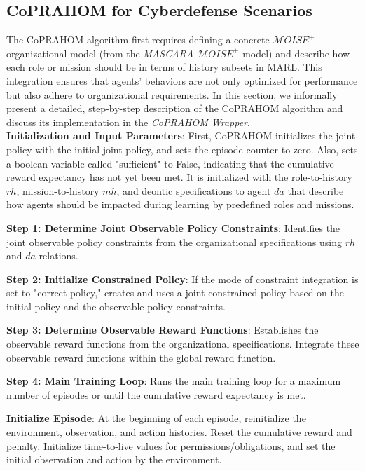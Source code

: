 \documentclass[conference]{IEEEtran}
\newcounter{relation}
\begin{document}
\subsection{CoPRAHOM for Cyberdefense Scenarios}

The CoPRAHOM algorithm first requires defining a concrete $\mathcal{M}OISE^+$ organizational model (from the \textit{MASCARA-$\mathcal{M}OISE^+$} model) and describe how each role or mission should be in terms of history subsets in MARL.
This integration ensures that agents' behaviors are not only optimized for performance but also adhere to organizational requirements.
%
In this section, we informally present a detailed, step-by-step description of the CoPRAHOM algorithm and discuss its implementation in the \textit{CoPRAHOM Wrapper}.\\

\textbf{Initialization and Input Parameters}:
First, CoPRAHOM initializes the joint policy with the initial joint policy, and sets the episode counter to zero. Also, sets a boolean variable called "sufficient" to False, indicating that the cumulative reward expectancy has not yet been met. It is initialized with the role-to-history $rh$, mission-to-history $mh$, and deontic specifications to agent $da$ that describe how agents should be impacted during learning by predefined roles and missions.

\textbf{Step 1: Determine Joint Observable Policy Constraints}:
Identifies the joint observable policy constraints from the organizational specifications using $rh$ and $da$ relations.

\textbf{Step 2: Initialize Constrained Policy}:
If the mode of constraint integration is set to "correct policy," creates and uses a joint constrained policy based on the initial policy and the observable policy constraints.

\textbf{Step 3: Determine Observable Reward Functions}:
Establishes the observable reward functions from the organizational specifications. Integrate these observable reward functions within the global reward function.

\textbf{Step 4: Main Training Loop}:
Runs the main training loop for a maximum number of episodes or until the cumulative reward expectancy is met.

\textbf{Initialize Episode}:
At the beginning of each episode, reinitialize the environment, observation, and action histories. Reset the cumulative reward and penalty. Initialize time-to-live values for permissions/obligations, and set the initial observation and action by the environment.
\end{document}
